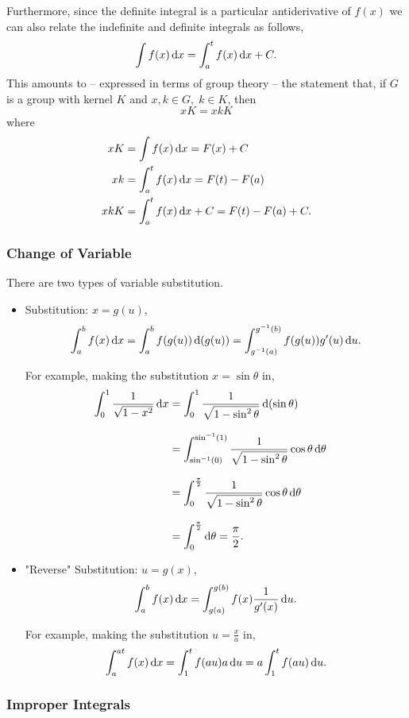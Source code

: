 \documentclass[../MathsNotesBase.tex]{subfiles}
\begin{document}
{		Furthermore, since the definite integral is a particular antiderivative of $f(x)$ we can also relate the indefinite and definite integrals as follows,
		\[ \int f(x) \dif x = \int_a^t f(x) \dif x + C. \]
		This amounts to -- expressed in terms of group theory -- the statement that, if $G$ is a group with kernel $K$ and ${ x,k \in G,\; k \in K }$, then
		\[ xK = xkK \] 
		where 
		\begin{align*}
			xK &= \int f(x) \dif x = F(x) + C \\
			xk &= \int_a^t f(x) \dif x = F(t) - F(a) \\
			xkK &= \int_a^t f(x) \dif x + C = F(t) - F(a) + C.
		\end{align*}
	
	
		\bigskip
		\subsubsection{Change of Variable}
		\bigskip
		There are two types of variable substitution.
		\begin{itemize}
			\item{Substitution: ${ x = g(u) }$,
				\[ \int_a^b f(x) \dif x = \int_a^b f(g(u)) \dif\, (g(u)) = \int_{\inv{g}(a)}^{\inv{g}(b)} f(g(u)) g'(u) \dif u. \]
				
				For example, making the substitution ${ x = \sin\theta }$ in,
				\[\begin{aligned}
					\int_0^1 \frac{1}{\sqrt{1 - x^2}} \dif x &= \int_0^1 \frac{1}{\sqrt{1 - \sin^2\theta}} \dif\, (\sin\theta) \nnn
					&= \int_{\inv{\sin}(0)}^{\inv{\sin}(1)} \frac{1}{\sqrt{1 - \sin^2\theta}} \cos\theta \dif \theta &\sidecomment{} \nnn
					&= \int_0^{\frac{\pi}{2}} \frac{1}{\sqrt{1 - \sin^2\theta}} \cos\theta \dif \theta &\sidecomment{} \nnn
					&= \int_0^{\frac{\pi}{2}} \dif \theta = \frac{\pi}{2}.
				\end{aligned}\]	
			}
			\bigskip
			\item{"Reverse" Substitution: ${ u = g(x) }$,
				\[ \int_a^b f(x) \dif x = \int_{g(a)}^{g(b)} f(x) \frac{1}{g'(x)} \dif u. \]
				
				For example, making the substitution ${ u = \frac{x}{a} }$ in,
				\[ \int_a^{at} f(x) \dif x = \int_1^t f(au) a \dif u = a \int_1^t f(au) \dif u. \]
			}
		\end{itemize}
	
	
		\pagebreak
		\subsubsection{Improper Integrals}
		\bigskip
		}
\end{document}
